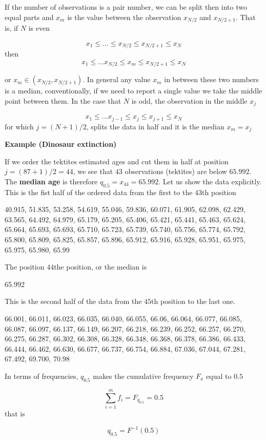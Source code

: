 \documentclass[
]{book}
\begin{document}
If the number of observations is a pair number, we can be split then into two equal parts and \(x_m\) is the value between the observation \(x_{N/2}\) and \(x_{N/2+1}\). That is, if \(N\) is even

\[x_1 \leq... \leq x_{N/2} \leq x_{N/2+1} \leq x_N\]
then
\[x_1 \leq ... x_{N/2} \leq x_m \leq x_{N/2+1} \leq x_N\]

or \(x_m \in (x_{N/2}, x_{N/2+1})\). In general any value \(x_m\) in between these two numbers is a median, conventionally, if we need to report a single value we take the middle point between them. In the case that \(N\) is odd, the observation in the middle \(x_j\)

\[x_1 \leq ... x_{j-1} \leq x_j \leq x_{j+1} \leq x_N\]
for which \(j=(N+1)/2\), splits the data in half and it is the median
\(x_m=x_j\)

\textbf{Example (Dinosaur extinction)}

If we order the tektites estimated ages and cut them in half at position \(j=(87+1)/2=44\), we see that \(43\) observations (tektites) are below \(65.992\). The \textbf{median age} is therefore \(q_{0.5}= x_{44}=65.992\). Let us show the data explicitly. This is the fist half of the ordered data from the first to the \(43\)th position

40.915, 51.835, 53.258, 54.619, 55.046, 59.836, 60.071, 61.905, 62.098, 62.429, 63.565, 64.492, 64.979, 65.179, 65.205, 65.406, 65.421, 65.441, 65.463, 65.624, 65.664, 65.693, 65.693, 65.710, 65.723, 65.739, 65.740, 65.756, 65.774, 65.792, 65.800, 65.809, 65.825, 65.857, 65.896, 65.912, 65.916, 65.928, 65.951, 65.975, 65.975, 65.980, 65.99

The position \(44\)the position, or the median is

65.992

This is the second half of the data from the \(45\)th position to the last one.

66.001, 66.011, 66.023, 66.035, 66.040, 66.055, 66.06, 66.064, 66.077, 66.085, 66.087, 66.097, 66.137, 66.149, 66.207, 66.218, 66.239, 66.252, 66.257, 66.270, 66.275, 66.287, 66.302, 66.308, 66.328, 66.348, 66.368, 66.378, 66.386, 66.433, 66.444, 66.462, 66.630, 66.677, 66.737, 66.754, 66.884, 67.036, 67.044, 67.281, 67.492, 69.700, 70.98

In terms of frequencies, \(q_{0.5}\) makes the cumulative frequency \(F_x\) equal to \(0.5\)

\[\sum_{i = 1}^m f_i =F_{q_{0.5}}=0.5\]
that is

\[q_{ 0.5}= F^{-1}(0.5)\]
\end{document}

